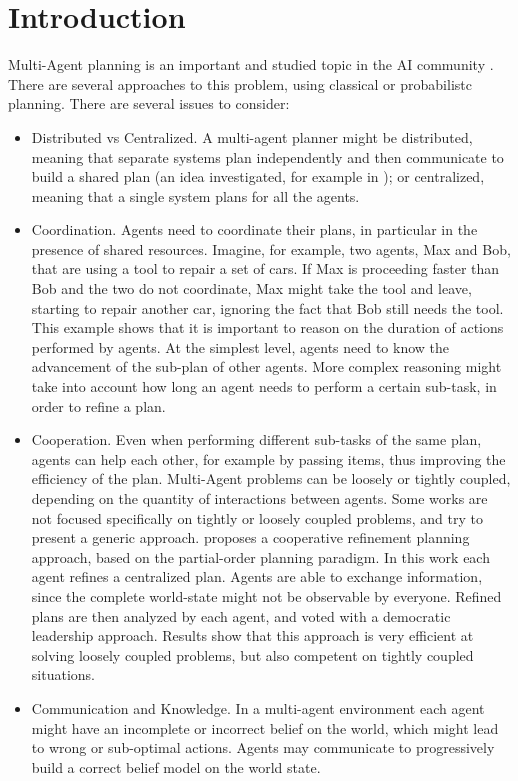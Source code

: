 \section{Introduction}
\label{sec:mamdp-intro}
Multi-Agent planning   is an important and studied topic in the AI community \citep{durfee1999survey}. There are several approaches to this problem, using classical or probabilistc planning. There are several issues to consider:
\begin{itemize}
\item Distributed vs Centralized. A multi-agent planner might be distributed, meaning that separate systems plan independently and then communicate to build a shared plan (an idea investigated, for example in \cite{nikolaidis2013cross,guestrin2002distributed} ); or centralized, meaning that a single system plans for all the agents.
\item Coordination. Agents need to coordinate their plans, in particular in the presence of shared resources. Imagine, for example, two agents, Max and Bob, that are using a tool to repair a set of cars. If Max is proceeding faster than Bob and the two do not coordinate, Max might take the tool and leave, starting to repair another car, ignoring the fact that Bob still needs the tool. This example shows that it is important to reason on the duration of actions performed by agents. At the simplest level, agents need to know the advancement of the sub-plan of other agents. More complex reasoning might take into account how long an agent needs to perform a certain sub-task, in order to refine a plan. 
\item Cooperation. Even when performing different sub-tasks of the same plan, agents can help each other, for example by passing items, thus improving the efficiency of the plan. Multi-Agent problems can be loosely or tightly coupled, depending on the quantity of interactions between agents. Some works are not focused specifically on tightly or loosely coupled problems, and try to present a generic approach. \cite{torreno2015approach} proposes a cooperative refinement planning approach, based on the partial-order planning paradigm. In this work each agent refines a centralized plan. Agents are able to exchange information, since the complete world-state might not be observable by everyone. Refined plans are then analyzed by each agent, and voted with a democratic leadership approach. Results show that this approach is very efficient at solving loosely coupled problems, but also competent on tightly coupled situations. 

\item Communication and Knowledge. In a multi-agent environment each agent might have an incomplete or incorrect belief on the world, which might lead to wrong or sub-optimal actions. Agents may communicate to progressively build a correct belief model on the world state. 
\end{itemize}

